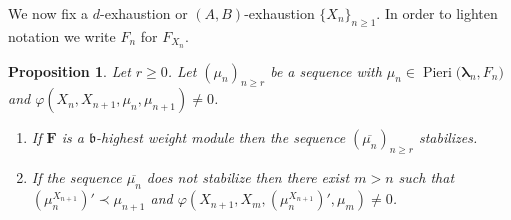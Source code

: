 \documentclass[11pt,fleqn]{amsart}
\renewcommand\phi{\varphi}
\newtheorem{prop}[thm]{Proposition}
\theoremstyle{definition}
\theoremstyle{remark}
\theoremstyle{remark}
\newcommand\lie[1]{\mathfrak{#1}}
\newcommand\wt[1]{\boldsymbol{#1}}
\newcommand\Pieri[2]{\operatorname{Pieri}{(#1},{#2)}}
\newcommand\map[4]{\phi(#3,#4,#1,#2)}
\begin{document}
We now fix a $d$-exhaustion or $(A,B)$-exhaustion $\{X_n\}_{n \geq 1}$. In 
order to lighten notation we write $F_n$ for $F_{X_n}$.

\begin{prop}
\label{prop:chasing}
Let $r \geq 0$. Let $(\mu_n)_{n \geq r}$ be a sequence with $\mu_n \in 
\Pieri{\wt\lambda_n}{F_n}$ and $\map{\mu_n}{\mu_{n+1}}{X_n}{X_{n+1}} \neq 0$. 
\begin{enumerate}
  \item If $\mathbf F$ is a $\lie b$-highest weight module then
    the sequence $(\overline{\mu_n})_{n \geq r}$ stabilizes.

  \item If the sequence $\overline{\mu_n}$ does not stabilize then there exist 
    $m > n$ such that $(\mu_n^{X_{n+1}})' \prec \mu_{n+1}$ and 
    $\map{(\mu_n^{X_{n+1}})' }{\mu_m}{X_{n+1}}{X_m} \neq 0$. 
\end{enumerate}
\end{prop}
\end{document}
